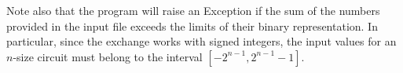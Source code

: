 \documentclass[12pt]{article}
\begin{document}
Note also that the program will raise an Exception if the sum of the numbers provided in the input file exceeds the limits of their binary representation. In particular, since the exchange works with signed integers, the input values for an $n$-size circuit must belong to the interval $[-2^{n-1}, 2^{n-1}-1]$. 



\end{document}

